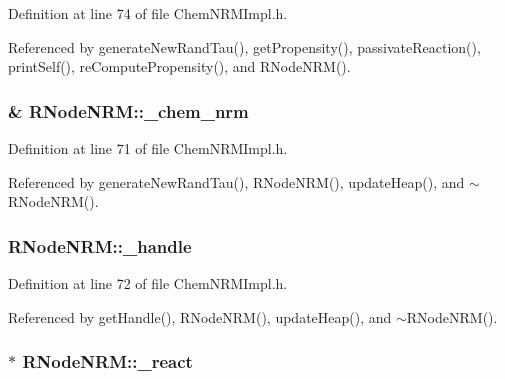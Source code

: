Definition at line 74 of file Chem\-N\-R\-M\-Impl.\-h.



Referenced by generate\-New\-Rand\-Tau(), get\-Propensity(), passivate\-Reaction(), print\-Self(), re\-Compute\-Propensity(), and R\-Node\-N\-R\-M().

\hypertarget{classRNodeNRM_ae7a8eb17ab2dc835ac90adc54027f96f}{
\subsubsection[{\-\_\-chem\-\_\-nrm}]{\& {\bf R\-Node\-N\-R\-M\-::\-\_\-chem\-\_\-nrm}}}\label{classRNodeNRM_ae7a8eb17ab2dc835ac90adc54027f96f}


Definition at line 71 of file Chem\-N\-R\-M\-Impl.\-h.



Referenced by generate\-New\-Rand\-Tau(), R\-Node\-N\-R\-M(), update\-Heap(), and $\sim$\-R\-Node\-N\-R\-M().

\hypertarget{classRNodeNRM_a8330d3bffc447a421484615c84ab080b}{
\subsubsection[{\-\_\-handle}]{ {\bf R\-Node\-N\-R\-M\-::\-\_\-handle}}}\label{classRNodeNRM_a8330d3bffc447a421484615c84ab080b}


Definition at line 72 of file Chem\-N\-R\-M\-Impl.\-h.



Referenced by get\-Handle(), R\-Node\-N\-R\-M(), update\-Heap(), and $\sim$\-R\-Node\-N\-R\-M().

\hypertarget{classRNodeNRM_ab598634c183c4fef1cc5dae8f8a9cbbc}{
\subsubsection[{\-\_\-react}]{$\ast$ {\bf R\-Node\-N\-R\-M\-::\-\_\-react}}}\label{classRNodeNRM_ab598634c183c4fef1cc5dae8f8a9cbbc}


